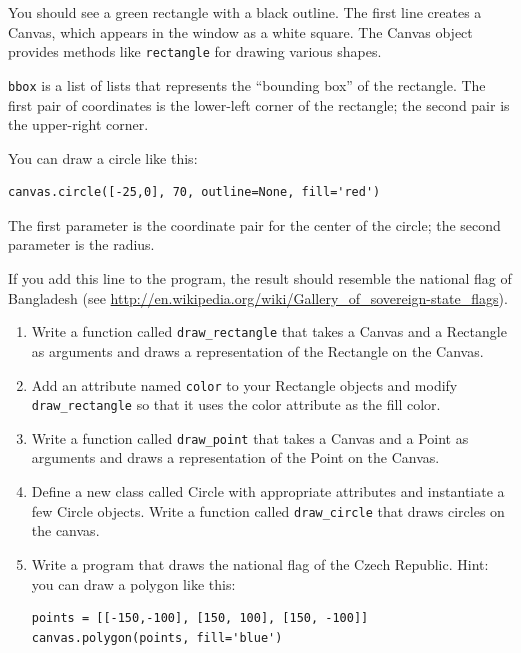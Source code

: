 \documentclass[10pt]{book}
\begin{document}
\begin{CJK}{UTF8}{gbsn}
\begin{exercise}
You should see a green rectangle with a black outline.
The first line creates a Canvas, which appears in the window
as a white square.  The Canvas object provides methods like
{\tt rectangle} for drawing various shapes.

{\tt bbox} is a list of lists that represents the ``bounding box''
of the rectangle.  The first pair of coordinates is the lower-left
corner of the rectangle; the second pair is the upper-right corner.

You can draw a circle like this:

\begin{verbatim}
canvas.circle([-25,0], 70, outline=None, fill='red')
\end{verbatim}

The first parameter is the coordinate pair for the center of the
circle; the second parameter is the radius.

If you add this line to the program, 
the result should resemble the national flag of Bangladesh
(see \url{http://en.wikipedia.org/wiki/Gallery_of_sovereign-state_flags}).

\begin{enumerate}

\item Write a function called \verb"draw_rectangle" that takes a
  Canvas and a Rectangle as arguments and draws a
  representation of the Rectangle on the Canvas.

\item Add an attribute named {\tt color} to your Rectangle objects and
  modify \verb"draw_rectangle" so that it uses the color attribute as
  the fill color.

\item Write a function called \verb"draw_point" that takes a
  Canvas and a Point as arguments and draws a
  representation of the Point on the Canvas.

\item Define a new class called Circle with appropriate attributes and
  instantiate a few Circle objects.  Write a function called
  \verb"draw_circle" that draws circles on the canvas.

\item Write a program that draws the national flag of the Czech Republic.
Hint: you can draw a polygon like this:

\begin{verbatim}
points = [[-150,-100], [150, 100], [150, -100]]
canvas.polygon(points, fill='blue')
\end{verbatim}


\end{enumerate}
\end{exercise}
\end{CJK}
\end{document}
